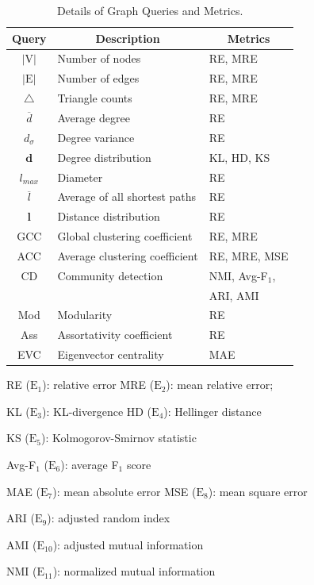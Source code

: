 \documentclass[conference]{IEEEtran}
\theoremstyle{plain}
\begin{document}
\begin{table}[t]
\small
	\caption{Details of Graph Queries and Metrics.}
	\label{tab:symnbols of graph queries}
	\centering
		\begin{tabular}{|c|l|l|}
			\hline
               Query & \multicolumn{1}{c|}{Description} & \multicolumn{1}{c|}{Metrics} \\ \hline
                $|\text{V}|$ &  Number of nodes & RE, MRE \\ 
                $|\text{E}|$ & Number of edges &  RE, MRE \\
                $\triangle$  & Triangle counts & RE, MRE \\
                $\overline{d}$ & Average degree & RE \\
                $d_{\sigma}$ & Degree variance & RE \\ 
                $\bm{d}$ & Degree distribution & KL, HD, KS \\ 
                $l_{max}$ & Diameter & RE \\
                $\overline{l}$ & Average of all shortest paths & RE \\
                $\bm{l}$ & Distance distribution & RE \\ 
                GCC  & Global clustering coefficient & RE, MRE \\
                ACC & Average clustering coefficient & RE, MRE, MSE \\ 
                CD & Community detection & NMI, Avg-F$_1$, \\
                & & ARI, AMI\\
                Mod & Modularity & RE\ \\
                Ass & Assortativity coefficient & RE \\ 
                EVC & Eigenvector centrality & MAE \\ \hline
   \end{tabular}
    \begin{tablenotes}
     \item[1] RE (${\text{E}_1}$): relative error \quad MRE (${\text{E}_2}$): mean relative error; 
     \item[1] KL (${\text{E}_3}$): KL-divergence \quad HD (${\text{E}_4}$): Hellinger distance 
     \item[1] KS (${\text{E}_5}$): Kolmogorov-Smirnov statistic 
     \item[1] Avg-F$_1$ (${\text{E}_6}$): average F$_1$ score
     \item[1] MAE (${\text{E}_7}$): mean absolute error \quad MSE (${\text{E}_8}$): mean square error
     \item[1] ARI (${\text{E}_9}$): adjusted random index 
     \item[1] AMI (${\text{E}_{10}}$): adjusted mutual information
     \item[1] NMI (${\text{E}_{11}}$): normalized mutual information 
   \end{tablenotes}
\end{table}
\end{document}
